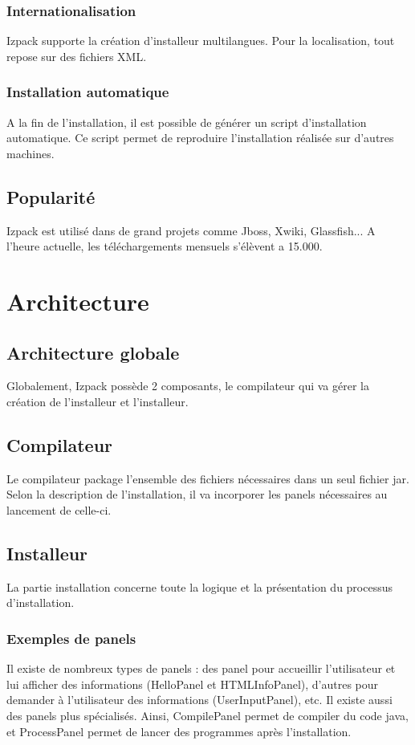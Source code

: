 \subsubsection{Internationalisation}
Izpack supporte la création d'installeur multilangues. Pour la localisation, tout repose sur des fichiers XML.
\subsubsection{Installation automatique}
A la fin de l'installation, il est possible de générer un script d'installation automatique. Ce script permet de reproduire l'installation réalisée sur d'autres machines.
\subsection{Popularité}
Izpack est utilisé dans de grand projets comme Jboss, Xwiki, Glassfish... A l'heure actuelle, les téléchargements mensuels s'élèvent a 15.000.
\section{Architecture}
\subsection{Architecture globale}
Globalement, Izpack possède 2 composants, le compilateur qui va gérer la création de l'installeur et l'installeur.
\subsection{Compilateur}
Le compilateur package l'ensemble des fichiers nécessaires dans un seul fichier jar. Selon la description de l'installation, il va incorporer les panels nécessaires au lancement de celle-ci. 
\subsection{Installeur}
La partie installation concerne toute la logique et la présentation du processus d'installation. 
\subsubsection{Exemples de panels}
Il existe de nombreux types de panels : des panel pour accueillir l'utilisateur et lui afficher des informations (HelloPanel et HTMLInfoPanel), d'autres pour demander à l'utilisateur des informations (UserInputPanel), etc.
Il existe aussi des panels plus spécialisés. Ainsi, CompilePanel permet de compiler du code java, et ProcessPanel permet de lancer des programmes après l'installation.

